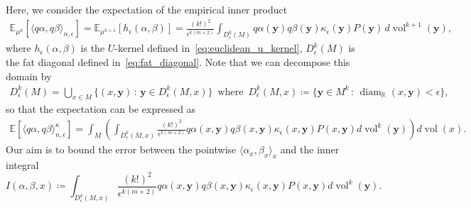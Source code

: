 \documentclass[11pt,reqno]{amsproc}
\numberwithin{equation}{section}
\newcommand{\R}{\mathbb{R}}
\newcommand{\E}{\mathbb{E}}
\newcommand{\by}{\mathbf{y}}
\newcommand{\vol}{\operatorname{vol}}
\newcommand{\diam}{\operatorname{diam}}
\newcommand{\dvol}{d\!\vol}
\theoremstyle{definition}
\theoremstyle{plain}
\begin{document}
    Here, we consider the expectation of the empirical inner product 
    \begin{align}
        \E_{\mu^n}[\langle q\alpha, q\beta\rangle_{n,\epsilon}] = \E_{\mu^{k+1}}[h_\epsilon(\alpha, \beta)] = \frac{(k!)^2}{\epsilon^{k(m+2)}} \int_{D^k_\epsilon(M)} q\alpha(\by) q\beta(\by) \kappa_\epsilon(\by) P(\by) \, \dvol^{k+1}(\by),
    \end{align}
    where $h_\epsilon(\alpha, \beta)$ is the $U$-kernel defined in~\eqref{eq:euclidean_u_kernel}, $D^k_\epsilon(M)$ is the fat diagonal defined in~\eqref{eq:fat_diagonal}.
    Note that we can decompose this domain by
    \begin{align} \label{eq:DM_decomposition}
        D^k_\epsilon(M) = \bigcup_{x \in M} \{(x, \by) \, : \, \by \in D^k_\epsilon(M,x)\} \hspace{6pt} \text{where} \hspace{6pt} D^k_\epsilon(M, x) \coloneqq \{ \by \in M^{k} \, : \, \diam_\R(x, \by) < \epsilon\},
    \end{align}
    so that the expectation can be expressed as
    \begin{align} \label{eq:bias_initial_expectation}
        \E[\langle q\alpha, q\beta\rangle^\kappa_{n,\epsilon}] = \int_M \left(\int_{D^k_\epsilon(M,x)} \frac{(k!)^2}{\epsilon^{k(m+2)}} q\alpha(x,\by) q\beta(x,\by) \kappa_\epsilon(x,\by) P(x,\by) \dvol^k(\by) \right) \dvol(x).
    \end{align}
    Our aim is to bound the error between the pointwise $\langle \alpha_x, \beta_x\rangle_x$ and the inner integral 
    \begin{equation} \label{eq:inner-integral}
        I(\alpha, \beta, x) \coloneq\int_{D^k_\epsilon(M,x)} \frac{(k!)^2}{\epsilon^{k(m+2)}} q\alpha(x,\by) q\beta(x,\by) \kappa_\epsilon(x,\by) P(x,\by) \dvol^k(\by).
    \end{equation}
\end{document}
